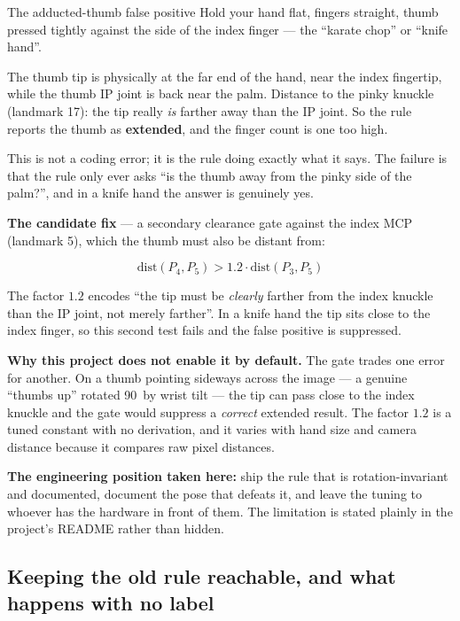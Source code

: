 \begin{edgetrap}{The adducted-thumb false positive}
Hold your hand flat, fingers straight, thumb pressed tightly against the side of the index finger ---
the ``karate chop'' or ``knife hand''.

The thumb tip is physically at the far end of the hand, near the index fingertip, while the thumb IP
joint is back near the palm. Distance to the pinky knuckle (landmark 17): the tip really \emph{is}
farther away than the IP joint. So the rule reports the thumb as \textbf{extended}, and the finger
count is one too high.

This is not a coding error; it is the rule doing exactly what it says. The failure is that the rule
only ever asks ``is the thumb away from the pinky side of the palm?'', and in a knife hand the answer
is genuinely yes.

\textbf{The candidate fix} --- a secondary clearance gate against the index MCP (landmark 5), which
the thumb must also be distant from:

$$\text{dist}(P_4, P_5) > 1.2 \cdot \text{dist}(P_3, P_5)$$

The factor $1.2$ encodes ``the tip must be \emph{clearly} farther from the index knuckle than the IP
joint, not merely farther''. In a knife hand the tip sits close to the index finger, so this second
test fails and the false positive is suppressed.

\textbf{Why this project does not enable it by default.} The gate trades one error for another. On a
thumb pointing sideways across the image --- a genuine ``thumbs up'' rotated 90\textdegree\ by wrist
tilt --- the tip can pass close to the index knuckle and the gate would suppress a \emph{correct}
extended result. The factor $1.2$ is a tuned constant with no derivation, and it varies with hand
size and camera distance because it compares raw pixel distances.

\textbf{The engineering position taken here:} ship the rule that is rotation-invariant and
documented, document the pose that defeats it, and leave the tuning to whoever has the hardware in
front of them. The limitation is stated plainly in the project's README rather than hidden.
\end{edgetrap}

\subsection{Keeping the old rule reachable, and what happens with no label}

